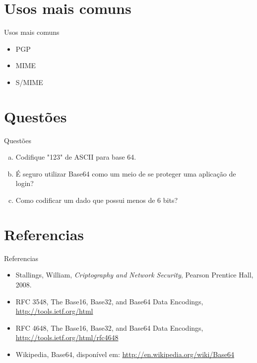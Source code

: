 \documentclass[pdf]{beamer}
\begin{document}
\section{Usos mais comuns}
\begin{frame}{Usos mais comuns}
\transdissolve
\begin{itemize}
\item PGP
\item MIME
\item S/MIME
\end{itemize}
\end{frame}
\section{Questões}
\begin{frame}{Questões}
\transdissolve
\begin{enumerate}[(a)]
\item Codifique "123" de ASCII para base 64.
\item É seguro utilizar Base64 como um meio de se proteger uma aplicação de login?
\item Como codificar um dado que possui menos de 6 bits?
\end{enumerate}
\end{frame}
\section{Referencias}
\begin{frame}{Referencias}
\begin{itemize}
\item Stallings, William, \emph{ Criptography and Network Security}, Pearson Prentice Hall, 2008.
\item RFC 3548, The Base16, Base32, and Base64 Data Encodings, \url{http://tools.ietf.org/html}
\item RFC 4648, The Base16, Base32, and Base64 Data Encodings, \url{http://tools.ietf.org/html/rfc4648}
\item Wikipedia, Base64, disponível em: \url{http://en.wikipedia.org/wiki/Base64}
\end{itemize}
\end{frame}
\end{document}
